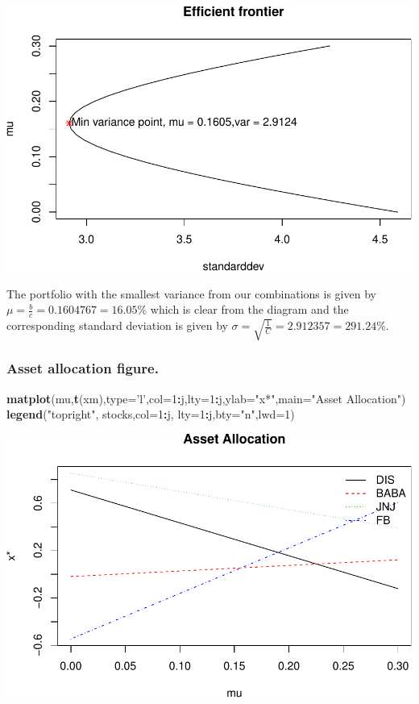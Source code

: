 \documentclass[]{article}
\newenvironment{Shaded}{\begin{snugshade}}{\end{snugshade}}
\newcommand{\KeywordTok}[1]{\textcolor[rgb]{0.13,0.29,0.53}{\textbf{#1}}}
\newcommand{\DataTypeTok}[1]{\textcolor[rgb]{0.13,0.29,0.53}{#1}}
\newcommand{\DecValTok}[1]{\textcolor[rgb]{0.00,0.00,0.81}{#1}}
\newcommand{\StringTok}[1]{\textcolor[rgb]{0.31,0.60,0.02}{#1}}
\newcommand{\OperatorTok}[1]{\textcolor[rgb]{0.81,0.36,0.00}{\textbf{#1}}}
\newcommand{\NormalTok}[1]{#1}
\begin{document}
\includegraphics{Markowitz_Research_Me_files/figure-latex/unnamed-chunk-17-2.pdf}

The portfolio with the smallest variance from our combinations is given
by \(\mu = \frac{b}{c} = 0.1604767 = 16.05\%\) which is clear from the
diagram and the corresponding standard deviation is given by
\(\sigma= \sqrt{\frac{1}{C}} = 2.912357 = 291.24\%\).

\subsubsection{Asset allocation figure.}\label{asset-allocation-figure.}

\begin{Shaded}
\begin{Highlighting}[]
\KeywordTok{matplot}\NormalTok{(mu,}\KeywordTok{t}\NormalTok{(xm),}\DataTypeTok{type=}\StringTok{'l'}\NormalTok{,}\DataTypeTok{col=}\DecValTok{1}\OperatorTok{:}\NormalTok{j,}\DataTypeTok{lty=}\DecValTok{1}\OperatorTok{:}\NormalTok{j,}\DataTypeTok{ylab=}\StringTok{"x*"}\NormalTok{,}\DataTypeTok{main=}\StringTok{"Asset Allocation"}\NormalTok{)}
\KeywordTok{legend}\NormalTok{(}\StringTok{"topright"}\NormalTok{, stocks,}\DataTypeTok{col=}\DecValTok{1}\OperatorTok{:}\NormalTok{j, }\DataTypeTok{lty=}\DecValTok{1}\OperatorTok{:}\NormalTok{j,}\DataTypeTok{bty=}\StringTok{"n"}\NormalTok{,}\DataTypeTok{lwd=}\DecValTok{1}\NormalTok{)}
\end{Highlighting}
\end{Shaded}

\includegraphics{Markowitz_Research_Me_files/figure-latex/unnamed-chunk-18-1.pdf}
\end{document}
